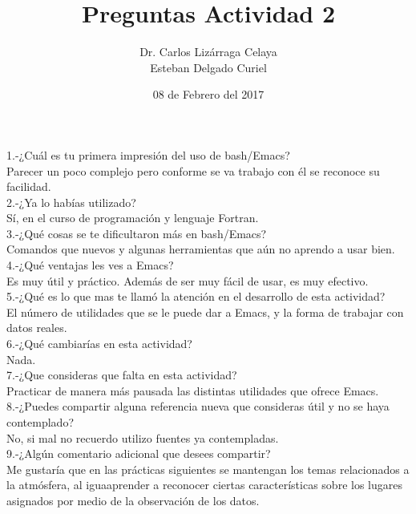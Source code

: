 \documentclass[12pt]{article}
\title{Preguntas Actividad 2}
\author{Dr. Carlos Lizárraga Celaya\\ Esteban Delgado Curiel}
\date{08 de Febrero del 2017}
\begin{document}
\maketitle

1.-¿Cuál es tu primera impresión del uso de bash/Emacs?\\
Parecer un poco complejo pero conforme se va trabajo con él se reconoce su facilidad.\\

2.-¿Ya lo habías utilizado? \\
Sí, en el curso de programación y lenguaje Fortran.\\

3.-¿Qué cosas se te dificultaron más en bash/Emacs?  \\
Comandos que nuevos y algunas herramientas que aún no aprendo a usar bien.\\

4.-¿Qué ventajas les ves a Emacs?\\
Es muy útil y práctico. Además de ser muy fácil de usar, es muy efectivo.\\

5.-¿Qué es lo que mas te llamó la atención en el desarrollo de esta actividad?\\
El número de utilidades que se le puede dar a Emacs, y la forma de trabajar con datos reales.\\

6.-¿Qué cambiarías en esta actividad?\\
Nada.\\

7.-¿Que consideras que falta en esta actividad?\\ 
Practicar de manera más pausada las distintas utilidades que ofrece Emacs.\\
    
8.-¿Puedes compartir alguna referencia nueva que consideras útil y no se haya contemplado?\\ 
No, si mal no recuerdo utilizo fuentes ya contempladas. \\

9.-¿Algún comentario adicional que desees compartir? \\
Me gustaría que en las prácticas siguientes se mantengan los temas relacionados a la atmósfera, al iguaaprender a reconocer ciertas características sobre los lugares asignados por medio de la observación de los datos.
\end{document}
